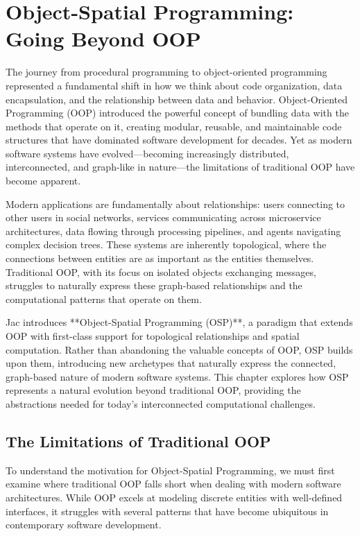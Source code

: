 \chapter{Object-Spatial Programming: Going Beyond OOP}

The journey from procedural programming to object-oriented programming represented a fundamental shift in how we think about code organization, data encapsulation, and the relationship between data and behavior. Object-Oriented Programming (OOP) introduced the powerful concept of bundling data with the methods that operate on it, creating modular, reusable, and maintainable code structures that have dominated software development for decades. Yet as modern software systems have evolved—becoming increasingly distributed, interconnected, and graph-like in nature—the limitations of traditional OOP have become apparent.

Modern applications are fundamentally about relationships: users connecting to other users in social networks, services communicating across microservice architectures, data flowing through processing pipelines, and agents navigating complex decision trees. These systems are inherently topological, where the connections between entities are as important as the entities themselves. Traditional OOP, with its focus on isolated objects exchanging messages, struggles to naturally express these graph-based relationships and the computational patterns that operate on them.

Jac introduces **Object-Spatial Programming (OSP)**, a paradigm that extends OOP with first-class support for topological relationships and spatial computation. Rather than abandoning the valuable concepts of OOP, OSP builds upon them, introducing new archetypes that naturally express the connected, graph-based nature of modern software systems. This chapter explores how OSP represents a natural evolution beyond traditional OOP, providing the abstractions needed for today's interconnected computational challenges.

\section{The Limitations of Traditional OOP}

To understand the motivation for Object-Spatial Programming, we must first examine where traditional OOP falls short when dealing with modern software architectures. While OOP excels at modeling discrete entities with well-defined interfaces, it struggles with several patterns that have become ubiquitous in contemporary software development.

